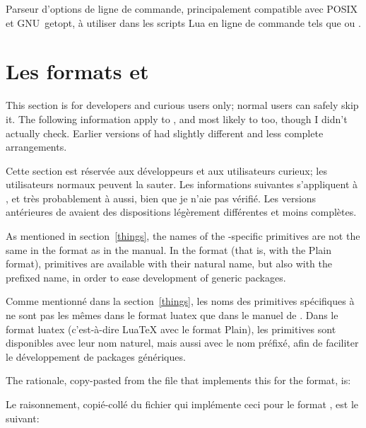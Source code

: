 \documentclass{lltxdoc}
\begin{document}
Parseur d'options de ligne de commande, principalement compatible avec POSIX et GNU~getopt, à utiliser dans les scripts Lua en ligne de commande tels que  ou .

\section{Les formats  et }\label{formats}

This section is for developers and curious users only; normal users can safely
skip it. The following information apply to , and most likely to
 too, though I didn't actually check. Earlier versions of \texlive
had slightly different and less complete arrangements.

Cette section est réservée aux développeurs et aux utilisateurs curieux; les utilisateurs normaux peuvent la sauter. Les informations suivantes s'appliquent à , et très probablement à  aussi, bien que je n'aie pas vérifié. Les versions antérieures de \texlive avaient des dispositions légèrement différentes et moins complètes.

As mentioned in section~\ref{things}, the names of the \luatex-specific
primitives are not the same in the  format as in the \luatex
manual. In the  format (that is, \luatex with the Plain format),
primitives are available with their natural name, but also with the prefixed
name, in order to ease development of generic packages.

Comme mentionné dans la section~\ref{things}, les noms des primitives spécifiques à \luatex ne sont pas les mêmes dans le format luatex que dans le manuel de \luatex. Dans le format luatex (c'est-à-dire LuaTeX avec le format Plain), les primitives sont disponibles avec leur nom naturel, mais aussi avec le nom préfixé, afin de faciliter le développement de packages génériques.

The rationale, copy-pasted from the file  that
implements this for the  format, is:

Le raisonnement, copié-collé du fichier  qui implémente ceci pour le format , est le suivant:
\end{document}
